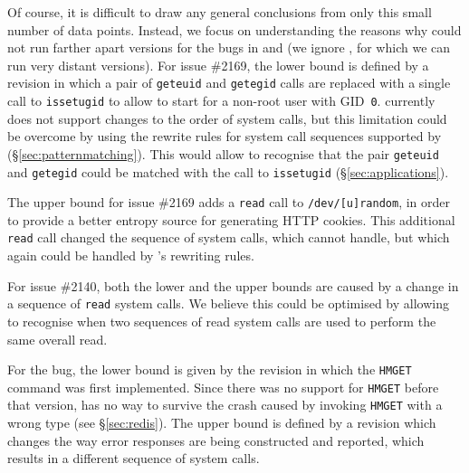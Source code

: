 Of course, it is difficult to draw any general conclusions from only
this small number of data points.  Instead, we focus on understanding
the reasons why \mx could not run farther apart versions for the bugs
in \lighttpd and \redis (we ignore \coreutils, for which we can run
very distant versions).
%
For \lighttpd issue \#2169, the lower bound is defined by a revision
in which a pair of \lstinline`geteuid` and \lstinline`getegid` calls
are replaced with a single call to \lstinline`issetugid` to
allow \lighttpd to start for a non-root user with GID~\lstinline`0`. \mx 
currently does not support changes to the order of system calls, but
this limitation could be overcome by using the rewrite rules for system call
sequences supported  by \varan (\S\ref{sec:patternmatching}). This would
allow \mx to recognise that the pair \lstinline`geteuid` and
\lstinline`getegid` could be matched with the call to
\lstinline`issetugid` (\S\ref{sec:applications}).

The upper bound for \lighttpd issue \#2169 adds a \lstinline`read` call to
\texttt{/dev/[u]random}, in order to provide a better entropy source for
generating HTTP cookies.  This additional \lstinline`read` call changed the
sequence of system calls, which \mx cannot handle, but which again could be
handled by \varan's rewriting rules.

For \lighttpd issue \#2140, both the lower and the upper bounds are
caused by a change in a sequence of \lstinline`read` system calls.  We
believe this could be optimised by allowing \mx to recognise when two
sequences of read system calls are used to perform the same overall
read.


For the \redis bug, the lower bound is given by the revision in which the
\lstinline`HMGET` command was first implemented.  Since there was no support for
\lstinline`HMGET` before that version, \mx has no way to survive the crash caused
by invoking \lstinline`HMGET` with a wrong type (see \S\ref{sec:redis}).  The
upper bound is defined by a revision which changes the way error responses are
being constructed and reported, which results in a different sequence of
system calls.

